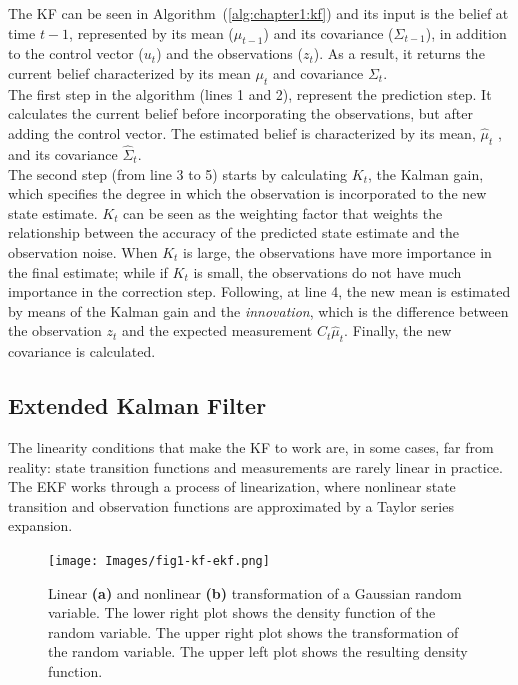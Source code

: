 The \ac{KF} can be seen in Algorithm~(\ref{alg:chapter1:kf}) and its input is the belief at time $t-1$, represented by its mean ($\mu_{t-1}$) and its covariance ($\Sigma_{t-1}$), in addition to the control vector ($u_t$) and the observations ($z_t$). As a result, it returns the current belief characterized by its mean $\mu_t$ and covariance $\Sigma_t$. \\

The first step in the algorithm (lines 1 and 2), represent the prediction step. It calculates the current belief before incorporating the observations, but after adding the control vector. The estimated belief is characterized by its mean, $\hat\mu_t$ , and its covariance $\hat\Sigma_t$.\\

The second step (from line 3 to 5) starts by calculating $K_t$, the Kalman gain, which specifies the degree in which the observation is incorporated to the new state estimate. $K_t$ can be seen as the weighting factor that weights the relationship between the accuracy of the predicted state estimate and the observation noise. When $K_t$ is large, the observations have more importance in the final estimate; while if $K_t$ is small, the observations do not have much importance in the correction step. Following, at line 4, the new mean is estimated by means of the Kalman gain and the \emph{innovation}, which is the difference between the observation $z_t$ and the expected measurement $C_t \hat\mu_t$. Finally, the new covariance is calculated.

\subsection{Extended Kalman Filter}
\label{subsec:chapter1:kf:ekf}

The linearity conditions that make the \ac{KF} to work are, in some cases, far from reality: state transition functions and measurements are rarely linear in practice. The \ac{EKF} works through a process of linearization, where nonlinear state transition and observation functions are approximated by a Taylor series expansion. \\

\begin{figure}
    \centering
    \texttt{[image: Images/fig1-kf-ekf.png]}
    \caption[Linear and nonlinear transformation of a Gaussian random variable]{Linear \textbf{(a)} and nonlinear \textbf{(b)} transformation of a Gaussian random variable. The lower right plot shows the density function of the random variable. The upper right plot shows the transformation of the random variable. The upper left plot shows the resulting density function. \cite{prob-robotics}}
    \label{fig:chapter1:kf:ekf:cmp-kf-ekf}
\end{figure}


